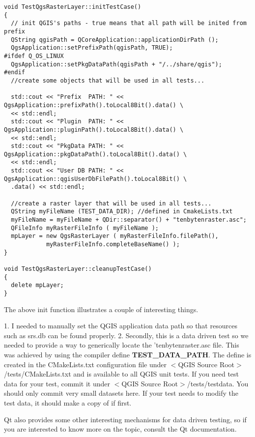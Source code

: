 \begin{verbatim}
void TestQgsRasterLayer::initTestCase()
{
  // init QGIS's paths - true means that all path will be inited from prefix
  QString qgisPath = QCoreApplication::applicationDirPath ();
  QgsApplication::setPrefixPath(qgisPath, TRUE);
#ifdef Q_OS_LINUX
  QgsApplication::setPkgDataPath(qgisPath + "/../share/qgis");
#endif
  //create some objects that will be used in all tests...

  std::cout << "Prefix  PATH: " << QgsApplication::prefixPath().toLocal8Bit().data() \
  << std::endl;
  std::cout << "Plugin  PATH: " << QgsApplication::pluginPath().toLocal8Bit().data() \
  << std::endl;
  std::cout << "PkgData PATH: " << QgsApplication::pkgDataPath().toLocal8Bit().data() \
  << std::endl;
  std::cout << "User DB PATH: " << QgsApplication::qgisUserDbFilePath().toLocal8Bit() \
  .data() << std::endl;

  //create a raster layer that will be used in all tests...
  QString myFileName (TEST_DATA_DIR); //defined in CmakeLists.txt
  myFileName = myFileName + QDir::separator() + "tenbytenraster.asc";
  QFileInfo myRasterFileInfo ( myFileName );
  mpLayer = new QgsRasterLayer ( myRasterFileInfo.filePath(),
            myRasterFileInfo.completeBaseName() );
}

void TestQgsRasterLayer::cleanupTestCase()
{
  delete mpLayer;
}

\end{verbatim}

The above init function illustrates a couple of interesting things.

 1. I needed to manually set the QGIS application data path so that
   resources such as srs.db can be found properly.
 2. Secondly, this is a data driven test so we needed to provide a 
   way to generically locate the 'tenbytenraster.asc file. This was 
   achieved by using the compiler define \textbf{TEST\_DATA\_PATH}. The 
   define is created in the CMakeLists.txt configuration file under 
   $<$QGIS Source Root$>$/tests/CMakeLists.txt and is available to all 
   QGIS unit tests. If you need test data for your test, commit it 
   under $<$QGIS Source Root$>$/tests/testdata. You should only commit 
   very small datasets here. If your test needs to modify the test 
   data, it should make a copy of if first.

Qt also provides some other interesting mechanisms for data driven 
testing, so if you are interested to know more on the topic, consult 
the Qt documentation.

